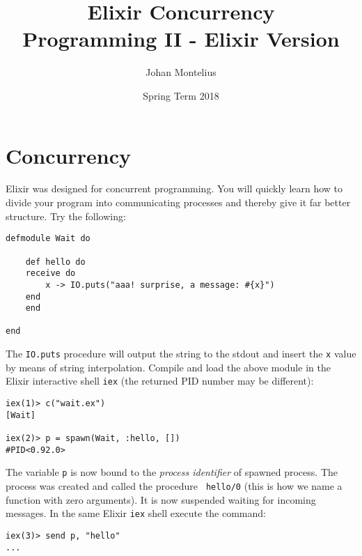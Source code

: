 \documentclass[a4paper,11pt]{article}
\begin{document}

\title{
    \textbf{Elixir Concurrency}\\
    \large{Programming II - Elixir Version}
}
\author{Johan Montelius}
\date{Spring Term 2018}
\maketitle
\thispagestyle{fancy}



\section*{Concurrency}

Elixir was designed for concurrent programming. You will quickly learn
how to divide your program into communicating processes and thereby
give it far better structure. Try the following:

\begin{verbatim}
defmodule Wait do

    def hello do
    receive do
        x -> IO.puts("aaa! surprise, a message: #{x}")
    end
    end

end
\end{verbatim}

The {\tt IO.puts} procedure will output the string to the stdout and
insert the {\tt x} value by means of string interpolation. Compile
and load the above module in the Elixir interactive shell {\tt iex} (the returned PID number may be different):

\begin{verbatim}
iex(1)> c("wait.ex")
[Wait]

iex(2)> p = spawn(Wait, :hello, [])
#PID<0.92.0>
\end{verbatim}

The variable {\tt p} is now bound to the {\em process identifier} of
spawned process. The process was created and called the procedure {\tt
    hello/0} (this is how we name a function with zero arguments). It is
now suspended waiting for incoming messages. In the same Elixir {\tt iex} shell
execute the command:

\begin{verbatim}
iex(3)> send p, "hello"
...
\end{verbatim}
\end{document}
